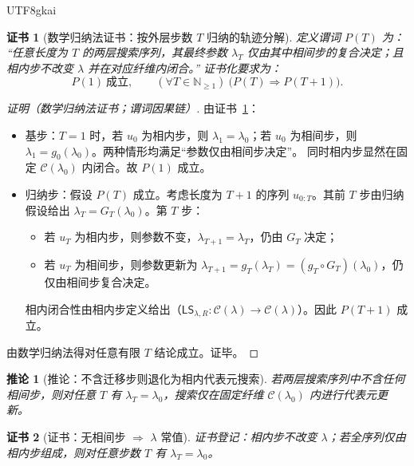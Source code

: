 \documentclass[12pt]{article}
\newtheorem{corollary}{推论}[section]
\newtheorem{Certificate}{证书}[section]
\newcommand{\NN}{\mathbb{N}}
\begin{document}
\begin{CJK*}{UTF8}{gkai}
\begin{Certificate}[数学归纳法证书：按外层步数 $T$ 归纳的轨迹分解]
\label{cert:twisted-two-level-search-decomposition}
定义谓词 $P(T)$ 为：
“任意长度为 $T$ 的两层搜索序列，其最终参数 $\lambda_T$ 仅由其中相间步的复合决定；且相内步不改变 $\lambda$ 并在对应纤维内闭合。”
证书化要求为：
\[
  P(1)\ \text{成立},\qquad
  (\forall T\in\NN_{\ge 1})\ \bigl(P(T)\Rightarrow P(T+1)\bigr).
\]
\end{Certificate}

\begin{proof}[证明（数学归纳法证书；谓词因果链）]
由证书~\ref{cert:twisted-two-level-search-decomposition}：
\begin{itemize}
  \item 基步：$T=1$ 时，若 $u_0$ 为相内步，则 $\lambda_1=\lambda_0$；若 $u_0$ 为相间步，则 $\lambda_1=g_0(\lambda_0)$。两种情形均满足“参数仅由相间步决定”。
    同时相内步显然在固定 $\mathcal{C}(\lambda_0)$ 内闭合。故 $P(1)$ 成立。
  \item 归纳步：假设 $P(T)$ 成立。考虑长度为 $T+1$ 的序列 $u_{0:T}$。其前 $T$ 步由归纳假设给出
  $\lambda_T = G_T(\lambda_0)$。第 $T$ 步：
  \begin{itemize}
    \item 若 $u_T$ 为相内步，则参数不变，$\lambda_{T+1}=\lambda_T$，仍由 $G_T$ 决定；
    \item 若 $u_T$ 为相间步，则参数更新为 $\lambda_{T+1}=g_T(\lambda_T)=(g_T\circ G_T)(\lambda_0)$，仍仅由相间步复合决定。
  \end{itemize}
  相内闭合性由相内步定义给出（$\mathsf{LS}_{\lambda,R}:\mathcal{C}(\lambda)\to\mathcal{C}(\lambda)$）。因此 $P(T+1)$ 成立。
\end{itemize}
由数学归纳法得对任意有限 $T$ 结论成立。证毕。
\end{proof}

\begin{corollary}[推论：不含迁移步则退化为相内代表元搜索]
\label{cor:twisted-search-reduces-to-intra-phase}
若两层搜索序列中不含任何相间步，则对任意 $T$ 有 $\lambda_T=\lambda_0$，搜索仅在固定纤维 $\mathcal{C}(\lambda_0)$ 内进行代表元更新。
\end{corollary}

\begin{Certificate}[证书：无相间步 $\Rightarrow$ $\lambda$ 常值]
\label{cert:twisted-search-reduces-to-intra-phase}
证书登记：相内步不改变 $\lambda$；若全序列仅由相内步组成，则对任意步数 $T$ 有 $\lambda_T=\lambda_0$。
\end{Certificate}


\end{CJK*}
\end{document}
